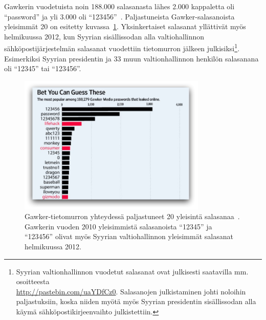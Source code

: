 \documentclass[finnish,gradu]{tktltiki}
\begin{document}
   Gawkerin vuodetuista noin 188.000 salasanasta lähes 2.000 kappaletta oli ``password'' ja yli 3.000 oli  ``123456''~\cite{forbes_gawker_12_2010}. Paljastuneista Gawker-salasanoista yleisimmät 20 on esitetty kuvassa~\ref{fig:gawker_top20_passwords}. Yksinkertaiset salasanat yllättivät myös helmikuussa 2012, kun Syyrian sisällissodan alla valtiohallinnon sähköpostijärjestelmän salasanat vuodettiin tietomurron jälkeen julkisiksi\footnote{Syyrian valtionhallinnon vuodetut salasanat ovat julkisesti saatavilla mm. osoitteesta
   \\\url{http://pastebin.com/uaYDfCz0}. Salasanojen julkistaminen johti noloihin paljastuksiin, koska niiden myötä myös Syyrian presidentin sisällissodan alla käymä sähköpostikirjeenvaihto julkistettiin.}. Esimerkiksi Syyrian presidentin ja 33 muun valtionhallinnon henkilön salasanana oli ``12345'' tai ``123456''.

  \begin{figure}
    \centering
    \includegraphics[width=0.8\textwidth]{images/gawker_top20_passwords.jpg}
    \caption[Gawker-tietomurrossa paljastuneet 20 yleisintä salasanaa.]{Gawker-tietomurron yhteydessä paljastuneet 20 yleisintä salasanaa~\cite{wsj_gawker_12_2010}. Gawkerin vuoden 2010 yleisimmistä salasanoista ``12345'' ja ``123456'' olivat myös Syyrian valtiohallinnon yleisimmät salasanat helmikuussa 2012.}
    \label{fig:gawker_top20_passwords}
  \end{figure}
\end{document}
